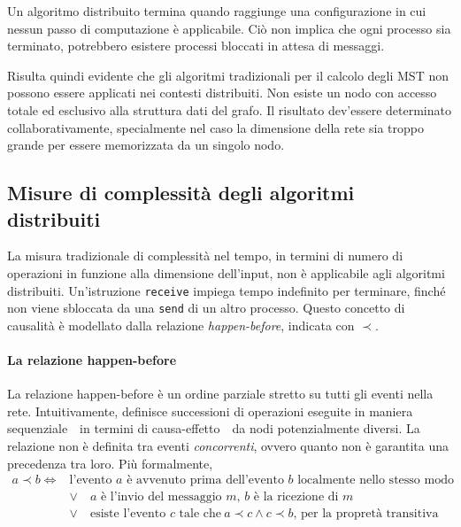 \documentclass[target=bach,aauheader=,style=]{thud}
\newcommand{\eng}[1]{\foreignlanguage{english}{#1}}
\begin{document}
Un algoritmo distribuito termina quando raggiunge una configurazione in cui nessun passo di computazione è applicabile. Ciò non implica che ogni processo sia terminato, potrebbero esistere processi bloccati in attesa di messaggi.

Risulta quindi evidente che gli algoritmi tradizionali per il calcolo degli MST non possono essere applicati nei contesti distribuiti. Non esiste un nodo con accesso totale ed esclusivo alla struttura dati del grafo. Il risultato dev'essere determinato collaborativamente, specialmente nel caso la dimensione della rete sia troppo grande per essere memorizzata da un singolo nodo.

\subsection{Misure di complessità degli algoritmi distribuiti}
La misura tradizionale di complessità nel tempo, in termini di numero di operazioni in funzione alla dimensione dell'\eng{input}, non è applicabile agli algoritmi distribuiti. Un'istruzione \lstinline{receive} impiega tempo indefinito per terminare, finché non viene sbloccata da una \lstinline{send} di un altro processo. Questo concetto di causalità è modellato dalla relazione \eng{\emph{happen-before}}, indicata con $\prec$.

\paragraph{La relazione \eng{happen-before}}
La relazione \eng{happen-before} è un ordine parziale stretto su tutti gli eventi nella rete. Intuitivamente, definisce successioni di operazioni eseguite in maniera sequenziale \,\textendash\, in termini di causa-effetto \,\textendash\, da nodi potenzialmente diversi. La relazione non è definita tra eventi \emph{concorrenti}, ovvero quanto non è garantita una precedenza tra loro. Più formalmente,
\begin{equation}
\begin{split}
a\prec b\iff &\text{l'evento $a$ è avvenuto prima dell'evento $b$ localmente nello stesso modo}\\
&\lor\quad\text{$a$ è l'invio del messaggio $m$, $b$ è la ricezione di $m$}\\
&\lor\quad\text{esiste l'evento $c$ tale che}\ a\prec c\land c\prec b\text{, per la propretà transitiva}
\end{split}
\end{equation}
\end{document}
